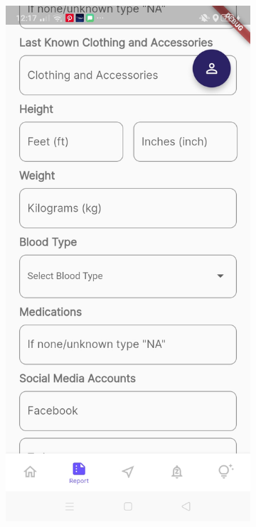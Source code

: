 \begin{figure}[!h]
\begin{subfigure}[c]{0.40\linewidth}
    \end{subfigure}
    \centering
    \begin{subfigure}[c]{0.40\linewidth}
        \centering
        \includegraphics[scale=0.15]{figures/Chapter4/Main/p4-3.jpg}

\end{subfigure}
\end{figure}
